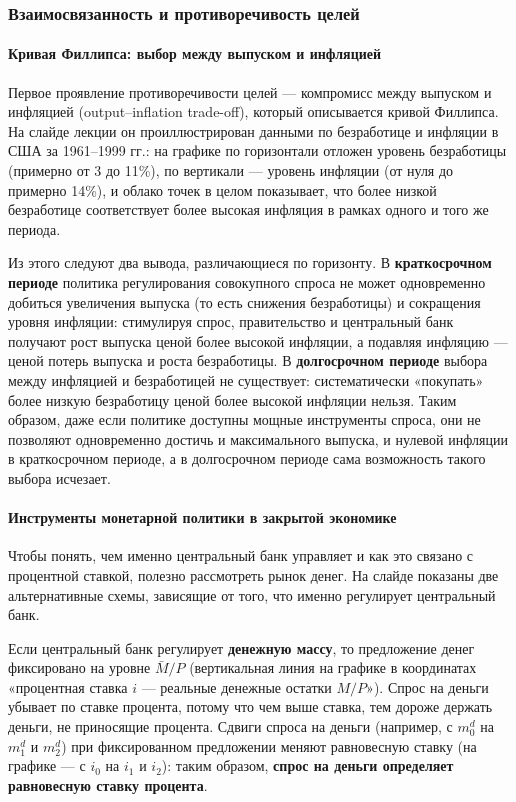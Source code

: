\documentclass[11pt,a4paper]{article}
\begin{document}
\subsubsection{Взаимосвязанность и противоречивость целей}

\paragraph{Кривая Филлипса: выбор между выпуском и инфляцией}

Первое проявление противоречивости целей --- компромисс между выпуском и инфляцией (output--inflation trade-off), который описывается кривой Филлипса. На слайде лекции он проиллюстрирован данными по безработице и инфляции в США за 1961--1999 гг.: на графике по горизонтали отложен уровень безработицы (примерно от 3 до 11\%), по вертикали --- уровень инфляции (от нуля до примерно 14\%), и облако точек в целом показывает, что более низкой безработице соответствует более высокая инфляция в рамках одного и того же периода.

Из этого следуют два вывода, различающиеся по горизонту. В \textbf{краткосрочном периоде} политика регулирования совокупного спроса не может одновременно добиться увеличения выпуска (то есть снижения безработицы) и сокращения уровня инфляции: стимулируя спрос, правительство и центральный банк получают рост выпуска ценой более высокой инфляции, а подавляя инфляцию --- ценой потерь выпуска и роста безработицы. В \textbf{долгосрочном периоде} выбора между инфляцией и безработицей не существует: систематически «покупать» более низкую безработицу ценой более высокой инфляции нельзя. Таким образом, даже если политике доступны мощные инструменты спроса, они не позволяют одновременно достичь и максимального выпуска, и нулевой инфляции в краткосрочном периоде, а в долгосрочном периоде сама возможность такого выбора исчезает.

\paragraph{Инструменты монетарной политики в закрытой экономике}

Чтобы понять, чем именно центральный банк управляет и как это связано с процентной ставкой, полезно рассмотреть рынок денег. На слайде показаны две альтернативные схемы, зависящие от того, что именно регулирует центральный банк.

Если центральный банк регулирует \textbf{денежную массу}, то предложение денег фиксировано на уровне $\bar M/P$ (вертикальная линия на графике в координатах «процентная ставка $i$ --- реальные денежные остатки $M/P$»). Спрос на деньги убывает по ставке процента, потому что чем выше ставка, тем дороже держать деньги, не приносящие процента. Сдвиги спроса на деньги (например, с $m_0^d$ на $m_1^d$ и $m_2^d$) при фиксированном предложении меняют равновесную ставку (на графике --- с $i_0$ на $i_1$ и $i_2$): таким образом, \textbf{спрос на деньги определяет равновесную ставку процента}.
\end{document}
